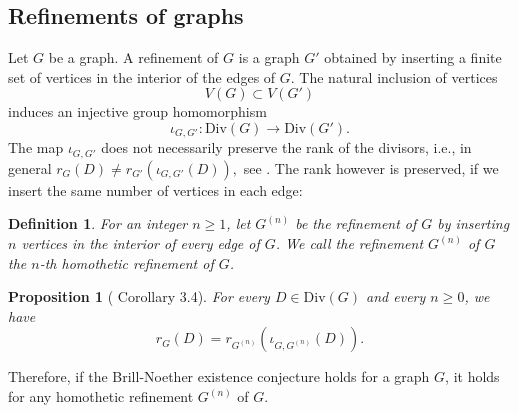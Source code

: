 \documentclass[11pt]{amsart}
\newtheorem{definition}{Definition}
\newtheorem{proposition}{Proposition}
\begin{document}
\subsection{Refinements of graphs}Let $G$ be a graph. A refinement of $G$ is a graph $G'$ obtained by inserting a finite set of vertices in the interior of the edges of $G$. The natural inclusion of vertices $$V(G)\subset V(G')$$ induces an injective group homomorphism
$$\iota_{G,G'}\colon\mathrm{Div}(G)\to\mathrm{Div}(G').$$ The map $\iota_{G,G'}$ does not necessarily preserve the rank of the divisors, i.e., in general $r_G(D)\neq r_{G'}(\iota_{G,G'}(D)),$ see \cite[Example 5.4]{MR2895184}. The rank however is preserved, if we insert the same number of vertices in each edge:



\begin{definition} For an integer $n\geq 1$, let $G^{(n)}$ be the refinement of $G$ by inserting $n$ vertices in the interior of every edge of $G$. We call the refinement  $G^{(n)}$ of $G$ the $n$-th homothetic refinement of $G$. %
\end{definition}

\begin{proposition}[\cite{MR3092681} Corollary 3.4]For every $D\in\mathrm{Div}(G)$ and every $n\geq0$, we have $$r_G(D)=r_{G^{(n)}}(\iota_{G,G^{(n)}}(D)).$$ 
\end{proposition}
Therefore, if the Brill-Noether existence conjecture holds for a graph $G$, it holds for any homothetic refinement $G^{(n)}$ of $G$. 

\end{document}

